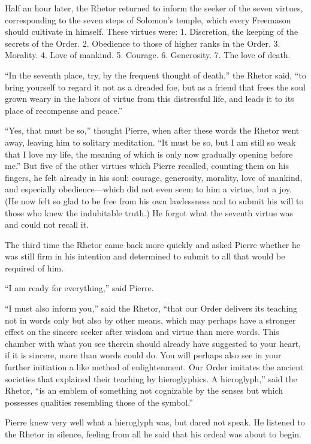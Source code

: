 Half an hour later, the Rhetor returned to inform the seeker of
the seven virtues, corresponding to the seven steps of Solomon's
temple, which every Freemason should cultivate in himself. These
virtues were: 1. Discretion, the keeping of the secrets of the
Order. 2. Obedience to those of higher ranks in the
Order. 3. Morality. 4. Love of mankind. 5.
Courage. 6. Generosity. 7. The love of death.

``In the seventh place, try, by the frequent thought of death,''
the Rhetor said, ``to bring yourself to regard it not as a
dreaded foe, but as a friend that frees the soul grown weary in
the labors of virtue from this distressful life, and leads it to
its place of recompense and peace.''

``Yes, that must be so,'' thought Pierre, when after these words
the Rhetor went away, leaving him to solitary meditation. ``It
must be so, but I am still so weak that I love my life, the
meaning of which is only now gradually opening before me.'' But
five of the other virtues which Pierre recalled, counting them on
his fingers, he felt already in his soul: courage, generosity,
morality, love of mankind, and especially obedience---which did
not even seem to him a virtue, but a joy. (He now felt so glad to
be free from his own lawlessness and to submit his will to those
who knew the indubitable truth.) He forgot what the seventh
virtue was and could not recall it.

The third time the Rhetor came back more quickly and asked Pierre
whether he was still firm in his intention and determined to
submit to all that would be required of him.

``I am ready for everything,'' said Pierre.

``I must also inform you,'' said the Rhetor, ``that our Order
delivers its teaching not in words only but also by other means,
which may perhaps have a stronger effect on the sincere seeker
after wisdom and virtue than mere words. This chamber with what
you see therein should already have suggested to your heart, if
it is sincere, more than words could do. You will perhaps also
see in your further initiation a like method of
enlightenment. Our Order imitates the ancient societies that
explained their teaching by hieroglyphics. A hieroglyph,'' said
the Rhetor, ``is an emblem of something not cognizable by the
senses but which possesses qualities resembling those of the
symbol.''

Pierre knew very well what a hieroglyph was, but dared not
speak. He listened to the Rhetor in silence, feeling from all he
said that his ordeal was about to begin.

